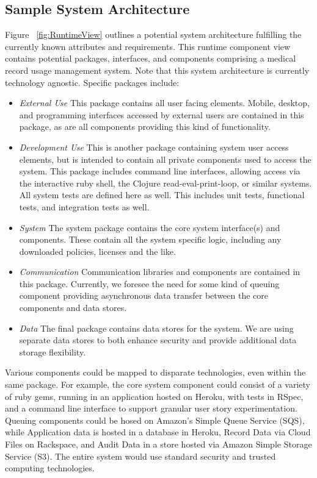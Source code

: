\documentclass[10pt, conference, compsocconf]{IEEEtran}
\begin{document}
\subsection{Sample System Architecture}
Figure ~\ref{fig:RuntimeView} outlines a potential system architecture fulfilling the currently known attributes and requirements.  This runtime component view contains potential packages, interfaces, and components comprising a medical record usage management system.  Note that this system architecture is currently technology agnostic.  Specific packages include:

\begin{itemize}

\item \textit{External Use} This package contains all user facing elements.  Mobile, desktop, and programming interfaces accessed by external users are contained in this package, as are all components providing this kind of functionality.

\item \textit{Development Use} This is another package containing system user access elements, but is intended to contain all private components used to access the system.  This package includes command line interfaces, allowing access via the interactive ruby shell, the Clojure read-eval-print-loop, or similar systems.  All system tests are defined here as well.  This includes unit tests, functional tests, and integration tests as well.

\item \textit{System} The system package contains the core system interface(s) and components.  These contain all the system specific logic, including any downloaded policies, licenses and the like.

\item \textit{Communication} Communication libraries and components are contained in this package.  Currently, we foresee the need for some kind of queuing component providing asynchronous data transfer between the core components and data stores.

\item \textit{Data} The final package contains data stores for the system.  We are using separate data stores to both enhance security and provide additional data storage flexibility.

\end{itemize}

Various components could be mapped to disparate technologies, even within the same package.  For example, the core system component could consist of a variety of ruby gems, running in an application hosted on Heroku, with tests in RSpec, and a command line interface to support granular user story experimentation.  Queuing components could be hosed on Amazon's Simple Queue Service (SQS), while Application data is hosted in a database in Heroku, Record Data via Cloud Files on Rackspace, and Audit Data in a store hosted via Amazon Simple Storage Service (S3).  The entire system would use standard security and trusted computing technologies.
\end{document}
